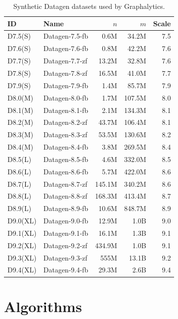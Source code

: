 \begin{table}[t!]
\caption{Synthetic Datagen datasets used by Graphalytics.}
\label{tab:datagen-datasets}
\centering
\begin{tabular}{|l|l|r|r|r|}
\hline
\textbf{ID} & \textbf{Name} & $n$ & $m$ & \textbf{Scale} \\
\hline \hline
D7.5(S) & Datagen-7.5-fb & 0.6M & 34.2M & 7.5 \\ \hline
D7.6(S) & Datagen-7.6-fb & 0.8M & 42.2M & 7.6 \\ \hline
D7.7(S) & Datagen-7.7-zf & 13.2M & 32.8M & 7.6 \\ \hline
D7.8(S) & Datagen-7.8-zf & 16.5M & 41.0M & 7.7 \\ \hline
D7.9(S) & Datagen-7.9-fb & 1.4M & 85.7M & 7.9 \\ \hline
D8.0(M) & Datagen-8.0-fb & 1.7M & 107.5M & 8.0 \\ \hline
D8.1(M) & Datagen-8.1-fb & 2.1M & 134.3M & 8.1 \\ \hline
D8.2(M) & Datagen-8.2-zf & 43.7M & 106.4M & 8.1 \\ \hline
D8.3(M) & Datagen-8.3-zf & 53.5M & 130.6M & 8.2 \\ \hline
D8.4(M) & Datagen-8.4-fb & 3.8M & 269.5M & 8.4 \\ \hline
D8.5(L) & Datagen-8.5-fb & 4.6M & 332.0M & 8.5 \\ \hline
D8.6(L) & Datagen-8.6-fb & 5.7M & 422.0M & 8.6 \\ \hline
D8.7(L) & Datagen-8.7-zf & 145.1M & 340.2M & 8.6 \\ \hline
D8.8(L) & Datagen-8.8-zf & 168.3M & 413.4M & 8.7 \\ \hline
D8.9(L) & Datagen-8.9-fb & 10.6M & 848.7M & 8.9 \\ \hline
D9.0(XL) & Datagen-9.0-fb & 12.9M & 1.0B & 9.0 \\ \hline
D9.1(XL) & Datagen-9.1-fb & 16.1M & 1.3B & 9.1 \\ \hline
D9.2(XL) & Datagen-9.2-zf & 434.9M & 1.0B & 9.1 \\ \hline
D9.3(XL) & Datagen-9.3-zf & 555M & 13.1B & 9.2 \\ \hline
D9.4(XL) & Datagen-9.4-fb & 29.3M & 2.6B & 9.4 \\ \hline
\end{tabular}
\end{table}



\section{Algorithms}
\label{sec:definition_algorithms}

